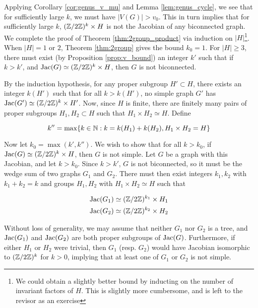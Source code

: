 \documentclass{amsart}
\begin{document}
Applying Corollary \ref{cor:genus_v_mu} and Lemma
\ref{lem:genus_cycle}, we see that for sufficiently large $k$, we must
have $|V(G)| > v_0$. This in turn implies that for sufficiently large
$k$, $(\mathbb{Z}/2\mathbb{Z})^k \times H$ is not the Jacobian of any biconnected
graph.\\

We complete the proof of Theorem \ref{thm:2group_product} via
induction on $|H|$\footnote{We could obtain a slightly better bound by
  inducting on the number of invariant factors of $H$. This is
  slightly more cumbersome, and is left to the revisor as an
  exercise}. When $|H| = 1$ or $2$, Theorem \ref{thm:2group} gives the
bound $k_0 = 1$. For $|H| \ge 3$, there must exist (by Proposition
\ref{prop:v_bound}) an integer $k'$ such that if $k > k'$, and
$\operatorname{Jac}(G) \simeq (\mathbb{Z}/2\mathbb{Z})^k \times H$, then $G$ is not biconnected.

By the induction hypothesis, for any proper subgroup $H' \subset H$,
there exists an integer $k(H')$ such that for all $k > k(H')$, no
simple graph $G'$ has $\operatorname{Jac}(G') \simeq (\mathbb{Z}/2\mathbb{Z})^k \times H'$. Now,
since $H$ is finite, there are finitely many pairs of proper subgroups
$H_1, H_2 \subset H$ such that $H_1 \times H_2 \simeq H$. Define

\begin{equation}
  k'' = \max\{k \in \mathbb{N} : k = k(H_1) + k(H_2), H_1 \times H_2 = H\}
\end{equation}

Now let $k_0 = \max(k', k'')$. We wish to show that for all $k > k_0$,
if $\operatorname{Jac}(G) \simeq (\mathbb{Z}/2\mathbb{Z})^k \times H$, then $G$ is not simple. Let
$G$ be a graph with this Jacobian, and let $k > k_0$.  Since $k > k'$,
$G$ is not biconnected, so it must be the wedge sum of two graphs
$G_1$ and $G_2$. There must then exist integers $k_1, k_2$ with $k_1 +
k_2 = k$ and groups $H_1, H_2$ with $H_1 \times H_2 \simeq H$ such
that

\begin{align}
  \operatorname{Jac}(G_1) &\simeq (\mathbb{Z}/2\mathbb{Z})^{k_1} \times H_1 \\
  \operatorname{Jac}(G_2) &\simeq (\mathbb{Z}/2\mathbb{Z})^{k_2} \times H_2
\end{align}

Without loss of generality, we may assume that neither $G_1$ nor $G_2$
is a tree, and $\operatorname{Jac}(G_1)$ and $\operatorname{Jac}(G_2)$ are both proper subgroups
of $\operatorname{Jac}(G)$. Furthermore, if either $H_1$ or $H_2$ were trivial, then
$G_1$ (resp. $G_2$) would have Jacobian isomorphic to $(\mathbb{Z}/2\mathbb{Z})^k$ for
$k > 0$, implying that at least one of $G_1$ or $G_2$ is not simple.
\end{document}

